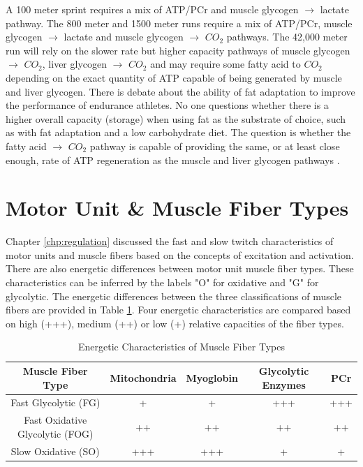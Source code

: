A 100 meter sprint requires a mix of ATP/PCr and muscle glycogen $\rightarrow$ lactate pathway. The 800 meter and 1500 meter runs require a mix of ATP/PCr, muscle glycogen $\rightarrow$ lactate and muscle glycogen $\rightarrow$ $CO_2$ pathways. The 42,000 meter run will rely on the slower rate but higher capacity pathways of muscle glycogen $\rightarrow$ $CO_2$, liver glycogen $\rightarrow$ $CO_2$ and may require some fatty acid to $CO_2$ depending on the exact quantity of ATP capable of being generated by muscle and liver glycogen. There is debate about the ability of fat adaptation to improve the performance of endurance athletes. No one questions whether there is a higher overall capacity (storage) when using fat as the substrate of choice, such as with fat adaptation and a low carbohydrate diet. The question is whether the fatty acid $\rightarrow$ $CO_2$ pathway is capable of providing the same, or at least close enough, rate of ATP regeneration as the muscle and liver glycogen pathways \cite{mcswiney_keto-adaptation_2018}.

\section{Motor Unit \& Muscle Fiber Types}

Chapter \ref{chp:regulation} discussed the fast and slow twitch characteristics of motor units and muscle fibers based on the concepts of excitation and activation. There are also energetic differences between motor unit muscle fiber types. These characteristics can be inferred by the labels "O" for oxidative and "G" for glycolytic. The energetic differences between the three classifications of muscle fibers are provided in Table \ref{table:Muscle_Fiber_Energetics}. Four energetic characteristics are compared based on high (+++), medium (++) or low (+) relative capacities of the fiber types. 

\begin{table}[h!]
\centering
\begin{tabular}{||c c c c c||} 
 \hline
 Muscle Fiber Type & Mitochondria & Myoglobin & Glycolytic Enzymes & PCr \\ [0.5ex] 
 \hline\hline
 Fast Glycolytic (FG)  & + & + & +++ & +++ \\ 
 Fast Oxidative Glycolytic (FOG) & ++ & ++ & ++ & ++ \\
 Slow Oxidative (SO) &  +++ & +++ & + & + \\ [1ex] 
 \hline
\end{tabular}
\caption{Energetic Characteristics of Muscle Fiber Types}
\label{table:Muscle_Fiber_Energetics}
\end{table}

